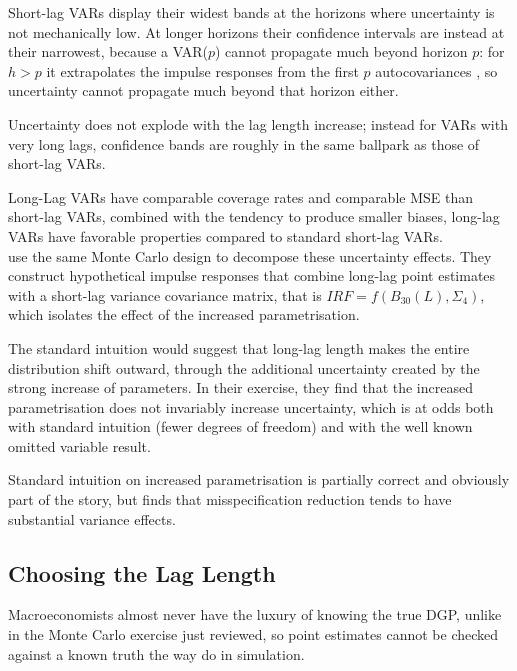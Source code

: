 \documentclass[12pt, a4paper]{article}
\begin{document}
Short-lag VARs display their widest bands at the horizons where uncertainty is not mechanically low. At longer
horizons their confidence intervals are instead at their narrowest, because a VAR($p$) cannot propagate much
beyond horizon $p$: for $h > p$ it extrapolates the impulse responses from the first $p$ autocovariances
\citep{Baumeister2025}, so uncertainty cannot propagate much beyond that horizon either.

Uncertainty does not explode with the lag length increase; instead for VARs with very long lags, confidence bands 
are roughly in the same ballpark as those of short-lag VARs.

Long-Lag VARs have comparable coverage rates and comparable MSE than short-lag VARs, combined with 
the tendency to produce smaller biases, long-lag VARs have favorable properties compared to standard short-lag VARs.
\\

\citet{Long_Lag2025} use the same Monte Carlo design to decompose these uncertainty effects. They construct
hypothetical impulse responses that combine long-lag point estimates with a short-lag variance covariance
matrix, that is $IRF = f(B_{30}(L), \Sigma_4)$, which isolates the effect of the increased parametrisation.

The standard intuition would suggest that long-lag length makes the entire distribution shift outward,
through the additional uncertainty created by the strong increase of parameters.
In their exercise, they find that the increased parametrisation does not invariably increase uncertainty, which is at odds both with standard intuition (fewer degrees of freedom) and with the well known omitted variable result.

Standard intuition on increased parametrisation is partially correct and obviously part of the story, but 
\citet{Long_Lag2025} finds that misspecification reduction tends to have substantial variance effects.

\subsection{Choosing the Lag Length}

Macroeconomists almost never have the luxury of knowing the true DGP, unlike in the Monte
Carlo exercise just reviewed, so point estimates cannot be checked against a known truth the
way \citet{Long_Lag2025} do in simulation. 
\end{document}
